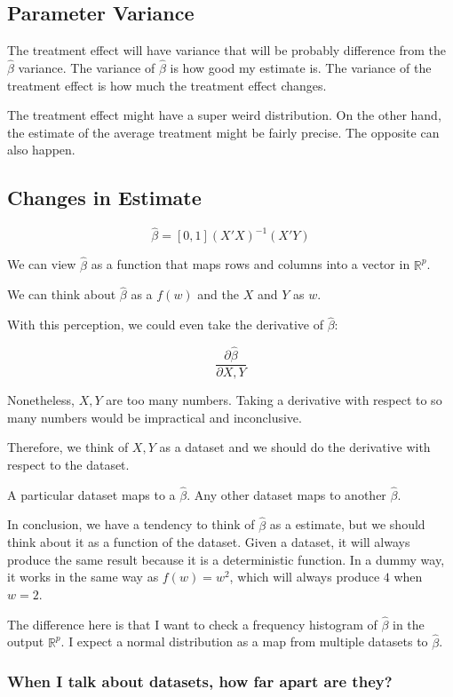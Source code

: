 \documentclass{article}
\begin{document}
\subsection{Parameter Variance}

The treatment effect will have variance that will be probably difference from the $\hat{\beta}$ variance. The variance of $\hat{\beta}$ is how good my estimate is. The variance of the treatment effect is how much the treatment effect changes.

The treatment effect might have a super weird distribution. On the other hand, the estimate of the average treatment might be fairly precise. The opposite can also happen.

\subsection{Changes in Estimate}

$$
\hat{\beta} = [0, 1] (X' X)^{-1} (X'Y)
$$

We can view $\hat{\beta}$ as a function that maps rows and columns into a vector in $\mathbb{R}^p$.

We can think about $\hat{\beta}$ as a $f(w)$ and the $X$ and $Y$ as $w$.

With this perception, we could even take the derivative of $\hat{\beta}$:

$$
\frac{\partial \hat{\beta}}{\partial X, Y}
$$

Nonetheless, $X, Y$ are too many numbers. Taking a derivative with respect to so many numbers would be impractical and inconclusive.

Therefore, we think of $X, Y$ as a dataset and we should do the derivative with respect to the dataset.

A particular dataset maps to a $\hat{\beta}$. Any other dataset maps to another $\hat{\beta}$.

In conclusion, we have a tendency to think of $\hat{\beta}$ as a estimate, but we should think about it as a function of the dataset. Given a dataset, it will always produce the same result because it is a deterministic function. In a dummy way, it works in the same way as $f(w) = w^2$, which will always produce $4$ when $w = 2$.

The difference here is that I want to check a frequency histogram of $\hat{\beta}$ in the output $\mathbb{R}^p$. I expect a normal distribution as a map from multiple datasets to $\hat{\beta}$.

\subsubsection{When I talk about datasets, how far apart are they?}
\end{document}
